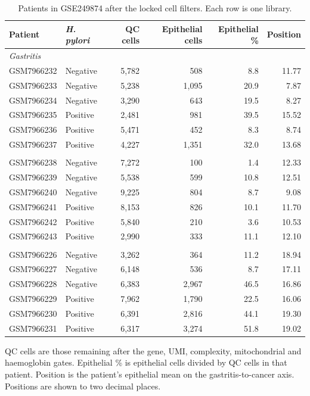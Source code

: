 \documentclass[11pt,a4paper]{article}
\begin{document}
\begin{table}[htbp]
  \centering
  \caption{Patients in GSE249874 after the locked cell filters. Each row is one library.}
  \label{tab:patients}
  \footnotesize
  \setlength{\tabcolsep}{4pt}
  \begin{tabular}{llrrrr}
    \toprule
    Patient & \textit{H. pylori} & QC cells & Epithelial cells & Epithelial \% & Position \\
    \midrule
    \multicolumn{6}{l}{\textit{Gastritis}} \\
    GSM7966232 & Negative & 5{,}782 & 508 & 8.8 & 11.77 \\
    GSM7966233 & Negative & 5{,}238 & 1{,}095 & 20.9 & 7.87 \\
    GSM7966234 & Negative & 3{,}290 & 643 & 19.5 & 8.27 \\
    GSM7966235 & Positive & 2{,}481 & 981 & 39.5 & 15.52 \\
    GSM7966236 & Positive & 5{,}471 & 452 & 8.3 & 8.74 \\
    GSM7966237 & Positive & 4{,}227 & 1{,}351 & 32.0 & 13.68 \\
    \addlinespace
    \multicolumn{6}{l}{\textit{Intestinal metaplasia}} \\
    GSM7966238 & Negative & 7{,}272 & 100 & 1.4 & 12.33 \\
    GSM7966239 & Negative & 5{,}538 & 599 & 10.8 & 12.51 \\
    GSM7966240 & Negative & 9{,}225 & 804 & 8.7 & 9.08 \\
    GSM7966241 & Positive & 8{,}153 & 826 & 10.1 & 11.70 \\
    GSM7966242 & Positive & 5{,}840 & 210 & 3.6 & 10.53 \\
    GSM7966243 & Positive & 2{,}990 & 333 & 11.1 & 12.10 \\
    \addlinespace
    \multicolumn{6}{l}{\textit{Gastric cancer}} \\
    GSM7966226 & Negative & 3{,}262 & 364 & 11.2 & 18.94 \\
    GSM7966227 & Negative & 6{,}148 & 536 & 8.7 & 17.11 \\
    GSM7966228 & Negative & 6{,}383 & 2{,}967 & 46.5 & 16.86 \\
    GSM7966229 & Positive & 7{,}962 & 1{,}790 & 22.5 & 16.06 \\
    GSM7966230 & Positive & 6{,}391 & 2{,}816 & 44.1 & 19.30 \\
    GSM7966231 & Positive & 6{,}317 & 3{,}274 & 51.8 & 19.02 \\
    \bottomrule
  \end{tabular}
  \par\vspace{0.35em}
  {\raggedright\footnotesize QC cells are those remaining after the gene, UMI, complexity, mitochondrial and haemoglobin gates. Epithelial \% is epithelial cells divided by QC cells in that patient. Position is the patient's epithelial mean on the gastritis-to-cancer axis. Positions are shown to two decimal places.\par}
\end{table}
\end{document}
